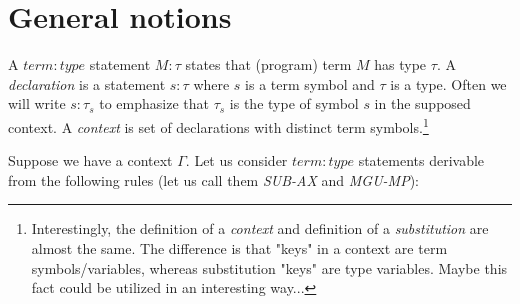 \documentclass[a4paper,oneside]{memoir}
\begin{document}
\section{General notions}

\begin{definition}
A $\mathit{term:type}$ statement $\mathit{M}:\mathit{\tau}$ states that (program) term $M$ has type $\tau$.   
A \textit{declaration} is a statement $s : \tau$ where $s$ is a term symbol and $\tau$ is a type.
Often we will write $s : \tau_s$ to emphasize that $\tau_s$ is the type of symbol $s$ in the supposed context.
A \textit{context} is set of declarations with distinct term symbols.\footnote{Interestingly, the definition of a \textit{context} and definition of a \textit{substitution} are almost the same. The difference is that "keys" in a context are term symbols/variables, whereas substitution "keys" are type variables. Maybe this fact could be utilized in an interesting way...}
\end{definition}

\newcommand{\sigmaPr}{\sigma^\prime}
\newcommand{\tauPr}{\tau^\prime}
\newcommand{\xPr}{x^\prime}
\newcommand{\nPr}{n^\prime}
\newcommand{\nPrr}{n^{\prime\prime}}
\newcommand{\nPrrr}{n^{\prime\prime\prime}}
\newcommand{\tausPr}{\tau_s^\prime}
\newcommand{\s}{\sigma}
\newcommand{\Th}{\theta}
\newcommand{\sPr}{\sigmaPr}
\newcommand{\thPr}{\theta^\prime}



\newcommand{\then}{\Rightarrow}
\newcommand{\E}[2]{(\exists #1)\ #2}
\newcommand{\A}[2]{(\forall #1)\ #2}
\newcommand{\Ain}[3]{(\forall #1 \in #2)\ #3}


\newcommand{\op}{\operatorname}

\newcommand{\ar}{\rightarrow}
\newcommand{\ap}[2]{(#1\,#2)}
\newcommand{\defi}{\coloneqq}
\newcommand{\defe}{\mathrel{\vcentcolon\equiv}}

\newcommand{\binRule}[3]{\dfrac{#1\ ,\ #2}{#3}}
\newcommand{\triRule}[4]{\dfrac{#1\ ,\ #2\ , \ #3}{#4}}
\newcommand{\isSub}[1]{#1\ \mathit{substitution}}
\newcommand{\MGU}[2]{\op{MGU}(#1,#2)}
\newcommand{\mgu}[1]{\op{MGU}(#1)}

\newcommand{\AX}{\textit{AX}\xspace}
\newcommand{\subAx}{\textit{SUB-AX}\xspace}
\newcommand{\mguMp}{\textit{MGU-MP}\xspace}
\newcommand{\abs}[1]{\lvert #1 \rvert}

Suppose we have a context $\Gamma$. Let us consider $\mathit{term:type}$ statements derivable from the following rules (let us call them \subAx and \mguMp):
\end{document}
